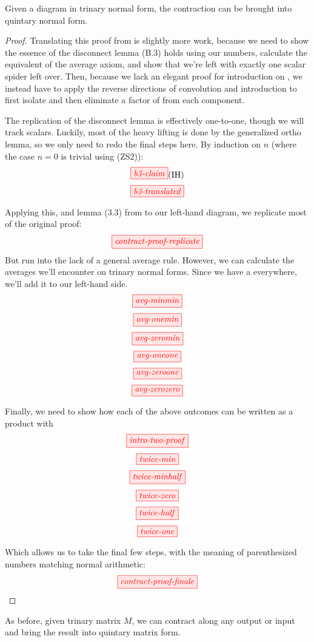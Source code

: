 \begin{lemma}\label{lem:tricontrquint}
    Given a diagram  in trinary normal form, the
    contraction  can be brought into quintary normal
    form.
\end{lemma}
\begin{proof}
    Translating this proof from \cite{backens2018zhcalculus} is slightly more
    work, because we need to show the essence of the disconnect lemma (B.3)
    holds using our numbers, calculate the equivalent of the average axiom, and
    show that we're left with exactly one scalar spider left over. Then, because
    we lack an elegant proof for introduction on , we instead have to
    apply the reverse directions of convolution and introduction to first
    isolate and then eliminate a factor of  from each
    component.


    The replication of the disconnect lemma is effectively one-to-one, though we
    will track scalars. Luckily, most of the heavy lifting is done by the
    generalized ortho lemma, so we only need to redo the final steps here.  By
    induction on $n$ (where the case $n=0$ is trivial using (ZS2)):
    $$\tikzfig{b3-claim} \text{(IH)}$$
    $$\tikzfig{b3-translated}$$

    Applying this, and lemma (3.3) from \cite{backens2018zhcalculus} to our
    left-hand diagram, we replicate most of the original proof:
    $$\tikzfig{contract-proof-replicate}$$
    But run into the lack of a general average rule. However, we can calculate
    the averages we'll encounter on trinary normal forms. Since we have a
     everywhere, we'll add it to our left-hand side.
    $$\tikzfig{avg-minmin}$$
    $$\tikzfig{avg-onemin}$$
    $$\tikzfig{avg-zeromin}$$
    $$\tikzfig{avg-oneone}$$
    $$\tikzfig{avg-zeroone}$$
    $$\tikzfig{avg-zerozero}$$

    Finally, we need to show how each of the above outcomes can be written as
    a product with 
    $$\tikzfig{intro-two-proof}$$
    $$\tikzfig{twice-min}$$
    $$\tikzfig{twice-minhalf}$$
    $$\tikzfig{twice-zero}$$
    $$\tikzfig{twice-half}$$
    $$\tikzfig{twice-one}$$

    Which allows us to take the final few steps, with the meaning of
    parenthesized numbers matching normal arithmetic:
    $$\tikzfig{contract-proof-finale}$$

\end{proof}
\begin{corollary}
    As before, given trinary matrix $M$, we can contract along any output or
    input and bring the result into quintary matrix form.
\end{corollary}

